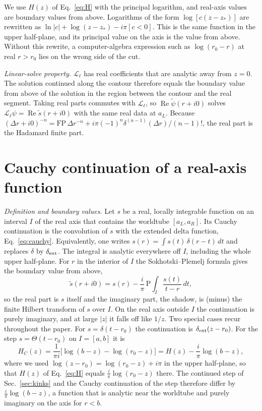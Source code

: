 \documentclass[aps,prd,twocolumn,superscriptaddress,nofootinbib,floatfix]{revtex4-2}
\renewcommand{\Re}{\operatorname{Re}}
\newcommand{\dext}{\delta_{\rm ext}}
\newcommand{\Lop}{\mathcal{L}_\ell}
\begin{document}
We use $H(z)$ of Eq.~\eqref{eq:H} with the principal logarithm, and real-axis values are boundary values from above.
Logarithms of the form $\log[c(z-z_*)]$ are rewritten as $\ln|c|+\log(z-z_*)-i\pi[c<0]$.
This is the same function in the upper half-plane, and its principal value on the axis is the value from above.
Without this rewrite, a computer-algebra expression such as $\log(r_0-r)$ at real $r>r_0$ lies on the wrong side of the cut.

\emph{Linear-solve property.}
$\Lop$ has real coefficients that are analytic away from $z=0$.
The solution continued along the contour therefore equals the boundary value from above of the solution in the region between the contour and the real segment.
Taking real parts commutes with $\Lop$, so $\Re\tilde\psi(r+i0)$ solves $\Lop\psi=\Re\tilde s(r+i0)$ with the same real data at $a_L$.
Because $(\Delta r+i0)^{-n}=\mathrm{FP}\,\Delta r^{-n}+i\pi(-1)^n\delta^{(n-1)}(\Delta r)/(n-1)!$, the real part is the Hadamard finite part.

\section{Cauchy continuation of a real-axis function}\label{app:cauchy}

\emph{Definition and boundary values.}
Let $s$ be a real, locally integrable function on an interval $I$ of the real axis that contains the worldtube $[a_L,a_R]$.
Its Cauchy continuation is the convolution of $s$ with the extended delta function, Eq.~\eqref{eq:cauchy}.
Equivalently, one writes $s(r)=\int s(t)\,\delta(r-t)\,dt$ and replaces $\delta$ by $\dext$.
The integral is analytic everywhere off $I$, including the whole upper half-plane.
For $r$ in the interior of $I$ the Sokhotski--Plemelj formula gives the boundary value from above,
\begin{equation}
\tilde s(r+i0)=s(r)-\frac{i}{\pi}\,\mathrm{P}\!\!\int_I\frac{s(t)}{t-r}\,dt,
\label{eq:plemelj}
\end{equation}
so the real part is $s$ itself and the imaginary part, the shadow, is (minus) the finite Hilbert transform of $s$ over $I$.
On the real axis outside $I$ the continuation is purely imaginary, and at large $|z|$ it falls off like $1/z$.
Two special cases recur throughout the paper.
For $s=\delta(t-r_0)$ the continuation is $\dext(z-r_0)$.
For the step $s=\Theta(t-r_0)$ on $I=[a,b]$ it is
\begin{equation}
H_C(z)=\frac{1}{\pi i}\big[\log(b-z)-\log(r_0-z)\big]=H(z)-\frac{i}{\pi}\log(b-z),
\label{eq:HC}
\end{equation}
where we used $\log(z-r_0)=\log(r_0-z)+i\pi$ in the upper half-plane, so that $H(z)$ of Eq.~\eqref{eq:H} equals $\tfrac{i}{\pi}\log(r_0-z)$ there.
The continued step of Sec.~\ref{sec:kinks} and the Cauchy continuation of the step therefore differ by $\tfrac{i}{\pi}\log(b-z)$, a function that is analytic near the worldtube and purely imaginary on the axis for $r<b$.
\end{document}
